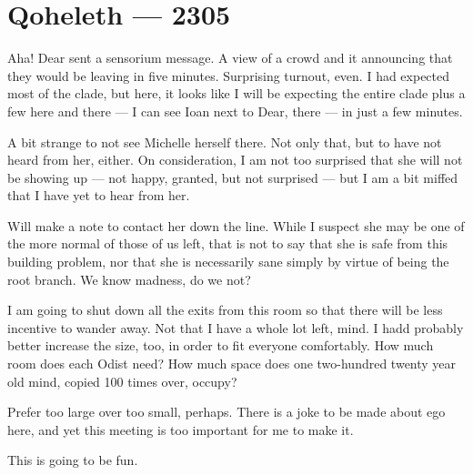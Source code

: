 \hypertarget{qoheleth-2305}{%
\chapter*{Qoheleth — 2305}\label{qoheleth-2305}}

Aha! Dear sent a sensorium message. A view of a crowd and it announcing that they would be leaving in five minutes. Surprising turnout, even. I had expected most of the clade, but here, it looks like I will be expecting the entire clade plus a few here and there — I can see Ioan next to Dear, there — in just a few minutes.

A bit strange to not see Michelle herself there. Not only that, but to have not heard from her, either. On consideration, I am not too surprised that she will not be showing up — not happy, granted, but not surprised — but I am a bit miffed that I have yet to hear from her.

Will make a note to contact her down the line. While I suspect she may be one of the more normal of those of us left, that is not to say that she is safe from this building problem, nor that she is necessarily sane simply by virtue of being the root branch. We know madness, do we not?

I am going to shut down all the exits from this room so that there will be less incentive to wander away. Not that I have a whole lot left, mind. I hadd probably better increase the size, too, in order to fit everyone comfortably. How much room does each Odist need? How much space does one two-hundred twenty year old mind, copied 100 times over, occupy?

Prefer too large over too small, perhaps. There is a joke to be made about ego here, and yet this meeting is too important for me to make it.

This is going to be fun.
